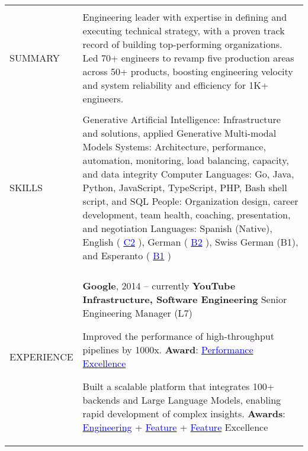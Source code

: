\documentclass[letterpaper,10pt,oneside]{article}
\newcommand{\DatestampY}[1]{#1}
\newcommand{\itemspacing}{\vspace{0.10cm}}
\newcommand{\sref}[2]{%
    \href{https://0/local/attachments/#1}{\textcolor{blue}{#2}}%
}
\newenvironment{body}
{\par\par
\begin{longtable}{p{0.145\textwidth}p{0.81\textwidth}}}
{\par\end{longtable}\par}
\renewcommand{\section}[3]{\\[-0.35cm]\pdfbookmark[2]{#2}{#3}\\%
\raggedleft  %
{\fontsize{9.5pt}{9.5pt}\selectfont\bfseries\raggedright%
\MakeUppercase{#1}}&}
\begin{document}
\begin{body}


\section{Summary}{Summary}{PDF:Summary}

Engineering leader with expertise in defining and executing technical strategy, with a proven track record of building top-performing organizations. Led 70+ engineers to revamp five production areas across 50+ products, boosting engineering velocity and system reliability and efficiency for 1K+ engineers.


\section{Skills}{Skills}{PDF:Skills}
Generative Artificial Intelligence: Infrastructure and solutions, applied Generative Multi-modal Models\newline
Systems: Architecture, performance, automation, monitoring, load balancing, capacity, and data integrity\newline
Computer Languages: Go, Java, Python, JavaScript, TypeScript, PHP, Bash shell script, and SQL\newline
People: Organization design, career development, team health, coaching, presentation, and negotiation\newline
Languages: Spanish (Native), English (\sref{Diploma-ESOLCPE.pdf}{C2}), German (\sref{Diploma-GoetheDeutsch-B2.pdf}{B2}), Swiss German (B1), and Esperanto (\sref{Diploma-EAB-Esperanto-Meznivela.pdf}{B1})


\section{Experience}{Experience}{PDF:Experience}

\textbf{Google}, \DatestampY{2014} -- currently \vspace{0.06cm} \newline
\phantom{g}\textbf{YouTube Infrastructure, Software Engineering} \textemdash{ }Senior Engineering Manager (L7)
\begin{comp}
\item Improved the performance of high-throughput pipelines by 1000x. \textbf{Award}: \sref{Google-Award-PerformanceExcellence.pdf}{Performance Excellence}
\item Built a scalable platform that integrates 100+ backends and Large Language Models, enabling rapid development of complex insights. \textbf{Awards}: \sref{Award-EngineeringExcellenceImpact.pdf}{Engineering} + \sref{Google-Award-FeatureExcellence.pdf}{Feature} + \sref{Google-Award-FeatureExcellence2.pdf}{Feature} Excellence
\end{comp}
\itemspacing


\end{body}
\end{document}
